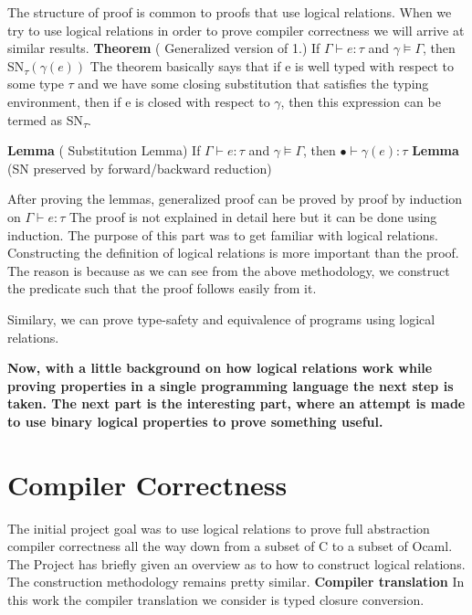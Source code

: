 \documentclass[10pt]{article}
\begin{document}
The structure of proof is common to proofs that use logical relations. When we try to use logical relations in order to prove compiler correctness we will arrive at similar results. 
\vskip 0.2in
\textbf{Theorem} ( Generalized version of 1.) If $\Gamma \vdash e : \tau $ and $\gamma \models \Gamma $, then SN\textsubscript{$\tau$}$ ( \gamma (e))$
\vskip 0.1in
The theorem basically says that if e is well typed with respect to some type $\tau$ and we have some closing substitution that satisfies the typing environment, then if e is closed with respect to $\gamma$, then this expression can be termed as SN\textsubscript{$\tau$}.

\vskip 0.2in
\textbf{Lemma} ( Substitution Lemma) If $\Gamma \vdash e : \tau $ and $\gamma \models \Gamma $, then $ \bullet \vdash \gamma (e) : \tau $
 \vskip 0.1in 
 \textbf{Lemma} (SN preserved by forward/backward reduction) 

  \vskip 0.2in 
  
After proving the lemmas, generalized proof can be proved by proof by induction on $\Gamma \vdash e : \tau $
  \vskip 0.1in
  The proof is not explained in detail here but it can be done using induction. The purpose of this part was to get familiar with logical relations. Constructing the definition of logical relations is more important than the proof. The reason is because as we can see from the above methodology, we construct the predicate such that the proof follows easily from it. 
  
  
\vskip 0.1in
Similary, we can prove type-safety and equivalence of programs using logical relations.   
\vskip 0.2in

\textbf{Now, with a little background on how logical relations work while proving properties in a single programming language the next step is taken. The next part is the interesting part, where an attempt is made to use binary logical properties to prove something useful.}

\newpage
\section{Compiler Correctness }
The initial project goal was to use logical relations to prove full abstraction compiler correctness all the way down from a subset of C to a subset  of Ocaml. The Project has briefly given an overview as to how to construct logical relations. The construction methodology remains pretty similar. 
\vskip 0.2in
\textbf{Compiler translation} In this work the compiler translation we consider is typed closure conversion.
\end{document}
